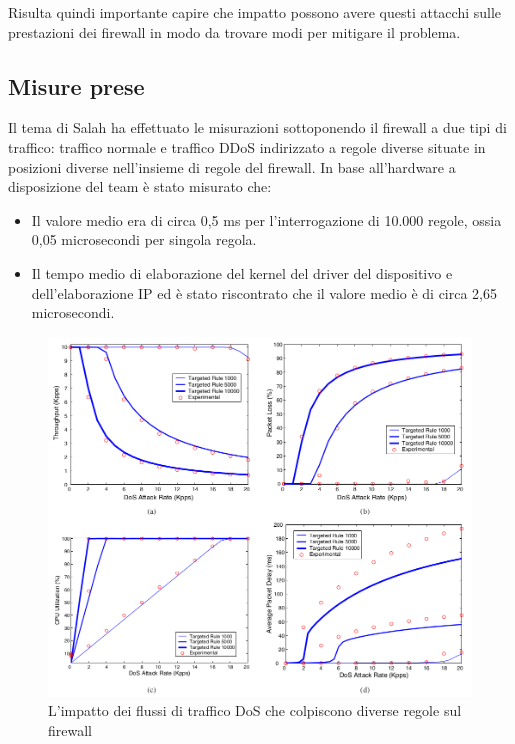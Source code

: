 Risulta quindi importante capire che impatto possono avere questi attacchi sulle prestazioni dei firewall in modo da trovare modi per mitigare il problema.

\subsection{Misure prese}

Il tema di Salah ha effettuato le misurazioni sottoponendo il firewall a due tipi di traffico: traffico normale e traffico DDoS indirizzato a regole diverse situate in posizioni diverse nell'insieme di regole del firewall.
\newline
\newline
In base all'hardware a disposizione del team è stato misurato che:
\begin{itemize}
  \item Il valore medio era di circa 0,5 ms per l'interrogazione di 10.000 regole, ossia 0,05 microsecondi per singola regola.
  \item Il tempo medio di elaborazione del kernel del driver del dispositivo e dell'elaborazione IP ed è stato riscontrato che il valore medio è di circa 2,65 microsecondi.
\end{itemize}

\begin{figure}[H]
  \centering
    \includegraphics[width=\linewidth]{img/dos.png}
    \caption{L'impatto dei flussi di traffico DoS che colpiscono diverse regole sul firewall}
  \label{fig:dos}
\end{figure}

